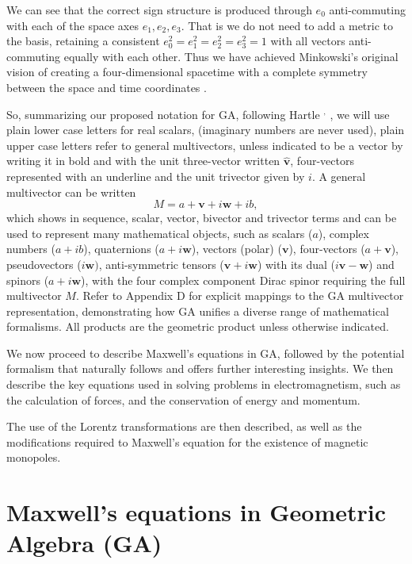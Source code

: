 \documentclass[12pt,aps,prb,preprint]{revtex4}   %
\newcommand{\be}{\begin{equation}}
\newcommand{\ee}{\end{equation}}
\newcommand{\iGA}{{i}}
\begin{document}
We can see that the correct sign structure is produced through $ e_0 $ anti-commuting with each of the space axes $ e_1,e_2,e_3 $.  That is we do not need to add a metric to the basis, retaining a consistent $ e_0^2 = e_1^2 = e_2^2 =e_3^2 =1 $ with all vectors anti-commuting equally with each other. Thus we have achieved Minkowski's original vision of creating a four-dimensional spacetime with a complete symmetry between the space and time coordinates \cite{EinsteinEtAl}.

So, summarizing our proposed notation for GA, following Hartle \cite{Hartle2003}$^,$ \cite{Rowland:2009}, we will use plain lower case letters for real scalars, (imaginary numbers are never used), plain upper case letters refer to general multivectors, unless indicated to be a vector by writing it in bold and with the unit three-vector written $ \mathbf{\hat{v}} $, four-vectors represented with an underline and the unit trivector given by $ \iGA $. A general multivector can be written
\be \label{generalMultivector}
M = a + \textbf{v} + \iGA \textbf{w} + \iGA b ,
\ee
which shows in sequence, scalar, vector, bivector and trivector terms and can be used to represent many mathematical objects, such as scalars ($a$), complex numbers ($ a + \iGA b $), quaternions ($a + \iGA \textbf{w}$), vectors (polar) ($\textbf{v}$), four-vectors ($a + \textbf{v}$), pseudovectors ($\iGA \textbf{w})$, anti-symmetric tensors ($\textbf{v} + \iGA \textbf{w}$) with its dual ($ \iGA \textbf{v} - \textbf{w}$) and spinors ($a + \iGA \textbf{w}$), with the four complex component Dirac spinor requiring the full multivector $ M $. Refer to Appendix D for explicit mappings to the GA multivector representation, demonstrating how GA unifies a diverse range of mathematical formalisms.
All products are the geometric product unless otherwise indicated.

We now proceed to describe Maxwell's equations in GA, followed by the potential formalism that naturally follows and offers further interesting insights.  We then describe the key equations used in solving problems in electromagnetism, such as the calculation of forces, and the conservation of energy and momentum.

The use of the Lorentz transformations are then described, as well as the modifications required to Maxwell's equation for the existence of magnetic monopoles.  

\section{Maxwell's equations in Geometric Algebra (GA)}
\end{document}
